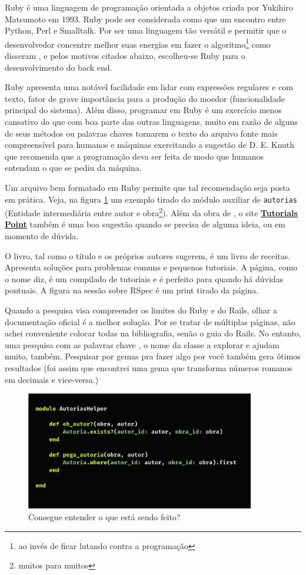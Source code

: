 Ruby é uma linguagem de programação orientada a objetos criada por Yukihiro
Matsumoto em 1993. Ruby pode ser considerada como que um encontro entre Python,
Perl e Smalltalk. Por ser uma linguagem tão versátil e permitir que o
desenvolvedor concentre melhor suas energias em fazer o algoritmo\footnote{ao
invés de ficar lutando contra a programação}  como disseram \citet{Rcook:09}, e
pelos motivos citados abaixo, escolheu-se Ruby para o desenvolvimento do back end.

Ruby apresenta uma notável facilidade em lidar com expressões regulares
e com texto, fator de grave importância para a produção do moedor (funcionalidade
principal do sistema). Além disso, programar em Ruby é um exercício menos cansativo
do que com boa parte das outras linguagens, muito em razão de alguns de seus métodos
ou palavras chaves tornarem o texto do arquivo fonte mais compreensível para
humanos e máquinas exercitando a sugestão de D. E. Knuth que recomenda que a
programação deva ser feita de modo que humanos entendam o que se pediu da máquina.

Um arquivo bem formatado em Ruby permite que tal recomendação seja posta em
prática. Veja, na figura \ref{fig:ruby} um exemplo tirado do módulo auxiliar de
\texttt{autorias} (Entidade intermediária entre autor e obra\footnote{muitos para
muitos}). Além da obra de \citet{Rcook:09}, o site
\href{https://www.tutorialspoint.com/ruby/index.htm}{\textbf{Tutorials Point}}
também é uma boa sugestão quando se precisa de alguma ideia, ou em momento de dúvida.

O livro, tal como o título e os próprios autores \cite[xvii]{Rcook:09} sugerem, é um
livro de receitas. Apresenta soluções para problemas comuns e pequenos tutoriais. A
página, como o nome diz, é um compilado de tutoriais e é perfeito para quando há
dúvidas pontuais. A figura na sessão sobre RSpec é um print tirado da página.

Quando a pesquisa visa compreender os limites do Ruby e do Rails, olhar a documentação
oficial é a melhor solução. Por se tratar de múltiplas páginas, não achei conveniente
colocar todas na bibliografia, senão o guia do Rails. No entanto, uma pesquisa com as
palavras chave , o nome da classe a explorar e  ajudam muito, também.
Pesquisar por gemas pra fazer algo por você também gera ótimos resultados (foi assim que
encontrei uma gema que transforma números romanos em decimais e vice-versa.)

\begin{figure}
    \centering
    \includegraphics[width=10cm]{figuras/ruby}
    \caption{Consegue entender o que está sendo feito?}
    \label{fig:ruby}
\end{figure}

